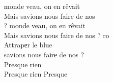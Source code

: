  monde veau, on en rêvait  \\
Mais  savions nous faire de nos \\
 ? monde veau, on en rêvait  \\
Mais  savions nous faire de nos  ? ro \\
Attrapеr le blue \\
 savions nous fairе de nos  ? \\
Pres\songwordfb{}que rien \\
Pres\songwordfb{}que rien \songwordfb{}
Presque